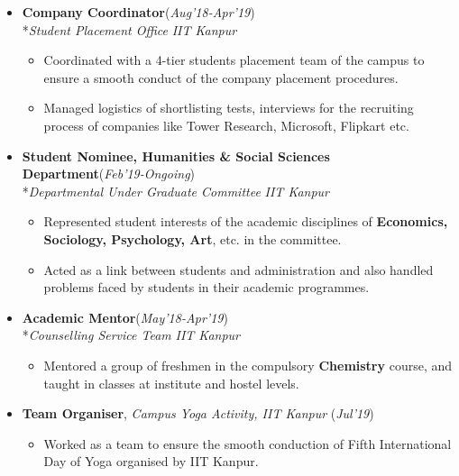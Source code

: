 \documentclass[10pt]{extarticle}
\begin{document}
\begin{itemize}
\item \textbf{Company Coordinator}\hfill\hfill(\textit{Aug'18-Apr'19})
\\*{\small\textit{Student Placement Office}}
\hfill\hfill \small\textit{{IIT Kanpur}}
\begin{itemize}
\item Coordinated with a 4-tier students placement team of the campus to ensure a smooth conduct of the company placement procedures.
\item Managed logistics of shortlisting tests, interviews for the recruiting process of companies like Tower Research, Microsoft, Flipkart etc.
\end{itemize}
\item \textbf{Student Nominee, Humanities \& Social Sciences Department}\hfill\hfill(\textit{Feb'19-Ongoing})
\\*{\small\textit{Departmental Under Graduate Committee}}
\hfill\hfill \small\textit{{IIT Kanpur}}
\begin{itemize}
\item Represented student interests of the academic disciplines of \textbf{Economics, Sociology, Psychology, Art}, etc. in the committee. 
\item Acted as a link between students and administration and also handled problems faced by students in their academic programmes.
\end{itemize}
\item \textbf{Academic Mentor}\hfill\hfill(\textit{May'18-Apr'19})
\\*{\small{\textit{Counselling Service Team}}}
\hfill\hfill {\small{\textit{IIT Kanpur}}}
\begin{itemize}
\item Mentored a group of freshmen in the compulsory \textbf{Chemistry} course, and taught in classes at institute and hostel levels.
\end{itemize}
\item \textbf{Team Organiser},\small{\textit{ Campus Yoga Activity, IIT Kanpur}}
\hfill\hfill(\textit{Jul'19})
\begin{itemize}
\item Worked as a team to ensure the smooth conduction of Fifth International Day of Yoga organised by IIT Kanpur.
\end{itemize}
\vspace{1mm}
\end{itemize}
\end{document}
